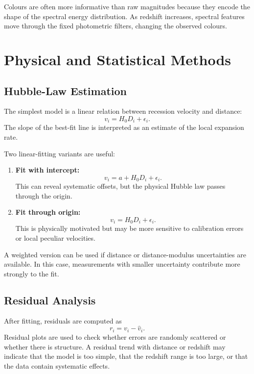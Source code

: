 \documentclass[11pt,a4paper]{article}
\begin{document}
Colours are often more informative than raw magnitudes because they encode the shape of the spectral energy distribution. As redshift increases, spectral features move through the fixed photometric filters, changing the observed colours.

\section{Physical and Statistical Methods}

\subsection{Hubble-Law Estimation}

The simplest model is a linear relation between recession velocity and distance:
\begin{equation}
    v_i = H_0 D_i + \epsilon_i.
\end{equation}
The slope of the best-fit line is interpreted as an estimate of the local expansion rate.

Two linear-fitting variants are useful:
\begin{enumerate}
    \item \textbf{Fit with intercept:}
    \begin{equation}
        v_i = a + H_0 D_i + \epsilon_i.
    \end{equation}
    This can reveal systematic offsets, but the physical Hubble law passes through the origin.
    \item \textbf{Fit through origin:}
    \begin{equation}
        v_i = H_0 D_i + \epsilon_i.
    \end{equation}
    This is physically motivated but may be more sensitive to calibration errors or local peculiar velocities.
\end{enumerate}

A weighted version can be used if distance or distance-modulus uncertainties are available. In this case, measurements with smaller uncertainty contribute more strongly to the fit.

\subsection{Residual Analysis}

After fitting, residuals are computed as
\begin{equation}
    r_i = v_i - \hat{v}_i.
\end{equation}
Residual plots are used to check whether errors are randomly scattered or whether there is structure. A residual trend with distance or redshift may indicate that the model is too simple, that the redshift range is too large, or that the data contain systematic effects.
\end{document}
